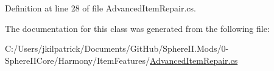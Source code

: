 Definition at line 28 of file Advanced\+Item\+Repair.\+cs.



The documentation for this class was generated from the following file\+:\begin{DoxyCompactItemize}
\item 
C\+:/\+Users/jkilpatrick/\+Documents/\+Git\+Hub/\+Sphere\+I\+I.\+Mods/0-\/\+Sphere\+I\+I\+Core/\+Harmony/\+Item\+Features/\mbox{\hyperlink{_advanced_item_repair_8cs}{Advanced\+Item\+Repair.\+cs}}\end{DoxyCompactItemize}
